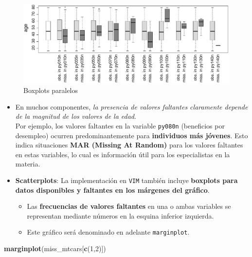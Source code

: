 \documentclass[
]{book}
\newenvironment{Shaded}{\begin{snugshade}}{\end{snugshade}}
\newcommand{\DecValTok}[1]{\textcolor[rgb]{0.00,0.00,0.81}{#1}}
\newcommand{\FunctionTok}[1]{\textcolor[rgb]{0.13,0.29,0.53}{\textbf{#1}}}
\newcommand{\NormalTok}[1]{#1}
\providecommand{\tightlist}{%
  \setlength{\itemsep}{0pt}\setlength{\parskip}{0pt}}
\begin{document}
\begin{figure}

{\centering \includegraphics[width=0.9\linewidth]{images/missing} 

}

\caption{Boxplots paralelos}\label{fig:mp-fig}
\end{figure}

\begin{itemize}
\item
  En muchos componentes, \emph{la presencia de valores faltantes claramente depende de la magnitud de los valores de la edad}.\\
  Por ejemplo, los valores faltantes en la variable \texttt{py080n} (beneficios por desempleo) ocurren predominantemente para \textbf{individuos más jóvenes}. Esto indica situaciones \textbf{MAR (Missing At Random)} para los valores faltantes en estas variables, lo cual es información útil para los especialistas en la materia.
\item
  \textbf{Scatterplots}: La implementación en \texttt{VIM} también incluye \textbf{boxplots para datos disponibles y faltantes en los márgenes del gráfico}.

  \begin{itemize}
  \tightlist
  \item
    Las \textbf{frecuencias de valores faltantes} en una o ambas variables se representan mediante números en la esquina inferior izquierda.\\
  \item
    Este gráfico será denominado en adelante \texttt{marginplot}.
  \end{itemize}
\end{itemize}

\begin{Shaded}
\begin{Highlighting}[]
\FunctionTok{marginplot}\NormalTok{(miss\_mtcars[}\FunctionTok{c}\NormalTok{(}\DecValTok{1}\NormalTok{,}\DecValTok{2}\NormalTok{)])}
\end{Highlighting}
\end{Shaded}
\end{document}
